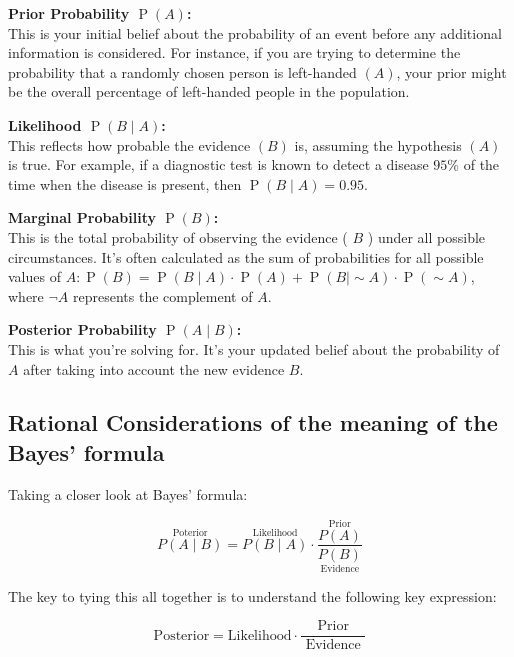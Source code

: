 \documentclass[
  12 pt,
  a4paper,
]{book}
\numberwithin{equation}{section}
\theoremstyle{plain}      %
\theoremstyle{definition} %
\theoremstyle{remark}     %
\theoremstyle{note}         %
\begin{document}
\textbf{Prior Probability \(\operatorname{P}(A)\):}\\
This is your initial belief about the probability of an event before any
additional information is considered. For instance, if you are trying to
determine the probability that a randomly chosen person is left-handed
\((A)\), your prior might be the overall percentage of left-handed
people in the population.

\textbf{Likelihood \(\operatorname{P}(B\! \mid\! A)\):}\\
This reflects how probable the evidence \((B)\) is, assuming the
hypothesis \((A)\) is true. For example, if a diagnostic test is known
to detect a disease \(95 \%\) of the time when the disease is present,
then \(\operatorname{P}(B\! \mid\! A)=0.95\).

\textbf{Marginal Probability \(\operatorname{P}(B)\):}\\
This is the total probability of observing the evidence ( \(B\) ) under
all possible circumstances. It's often calculated as the sum of
probabilities for all possible values of
\(A: \operatorname{P}(B)=\operatorname{P}(B\! \mid\! A) \cdot \operatorname{P}(A)+\operatorname{P}(B\! \mid \sim\! A) \cdot \operatorname{P}(\sim\! A)\),
where \(\neg A\) represents the complement of \(A\).

\textbf{Posterior Probability \(\operatorname{P}(A\! \mid\! B)\):}\\
This is what you're solving for. It's your updated belief about the
probability of \(A\) after taking into account the new evidence \(B\).

\hypertarget{rational-considerations-of-the-meaning-of-the-bayes-formula}{%
\subsection{Rational Considerations of the meaning of the Bayes'
formula}\label{rational-considerations-of-the-meaning-of-the-bayes-formula}}

Taking a closer look at Bayes' formula:

\[
\overset{\text{Poterior}}{P(A \! \mid \! B)} 
= 
\overset{\text{Likelihood}}{P(B \! \mid \! A)} 
\cdot 
\frac{
    \overset{\text{Prior}}{P(A)}
}{
    \underset{\text{Evidence}}{P(B)}
}
\]

The key to tying this all together is to understand the following key
expression:

\[
\text {Posterior} = \text {Likelihood} \cdot \frac{\text { Prior }}{\text { Evidence }}
\]
\end{document}
